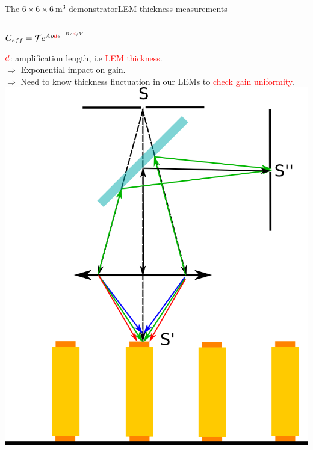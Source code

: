 \documentclass[10pt]{beamer}
\begin{document}
    \begin{frame}{The \texorpdfstring{$6 \times 6 \times \SI{6}{\meter\cubed}$}{666} demonstrator}{LEM thickness measurements}
    	\begin{scriptsize}
    		\begin{columns}
    			\begin{column}{0.5\textwidth}
    				\begin{center}
    					$G _{eff}= \mathcal{T}e^{A\rho \textcolor{red}{d} e^{-B\rho \textcolor{red}{d}/V}}$\\
    				\end{center}
    				$\textcolor{red}{d}$: amplification length, i.e \textcolor{red}{LEM thickness}.\\
    				$\Rightarrow$ Exponential impact on gain.\\
    				$\Rightarrow$ Need to know thickness fluctuation in our LEMs to \textcolor{red}{check gain uniformity}.\\
    				\vfill
    				\centering \includegraphics[height=0.5\textheight]{figures/666/CCI.png}\\\vfill
    			\end{column}

\end{columns}
\end{scriptsize}
\end{frame}
\end{document}
